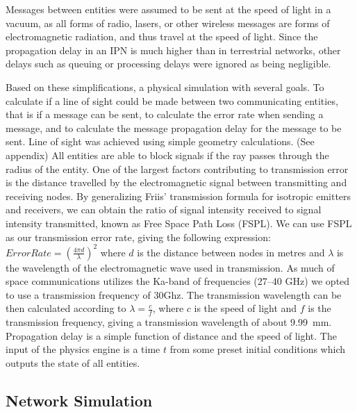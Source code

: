 \documentclass[a4paper,12pt]{article}
\begin{document}
Messages between entities were assumed to be sent at the speed of light in a
vacuum, as all forms of radio, lasers, or other wireless messages are forms of
electromagnetic radiation, and thus travel at the speed of light. Since the
propagation delay in an IPN is much higher than in terrestrial networks, other
delays such as queuing or processing delays were ignored as being negligible.

Based on these simplifications, a physical simulation with several goals. To
calculate if a line of sight could be made between two communicating entities,
that is if a message can be sent, to calculate the error rate when sending a
message, and to calculate the message propagation delay for the message to be
sent. Line of sight was achieved using simple geometry calculations. (See
appendix) All entities are able to block signals if the ray passes through the
radius of the entity. One of the largest factors contributing to transmission
error is the distance travelled by the electromagnetic signal between
transmitting and receiving nodes. By generalizing Friis' transmission
formula\cite{Friis} for isotropic emitters and receivers, we can obtain the
ratio of signal intensity received to signal intensity transmitted, known as
Free Space Path Loss (FSPL). We can use FSPL as our transmission error rate,
giving the following expression: $Error Rate = {(\frac{4 \pi d}{\lambda})}^2$
where $d$ is the distance between nodes in metres and $\lambda$ is the
wavelength of the electromagnetic wave used in transmission. As much of space
communications utilizes the Ka-band of frequencies (27--40
GHz)\cite{Morabito_Hastrup} we opted to use a transmission frequency of 30Ghz.
The transmission wavelength can be then calculated according to
$\lambda = \frac{c}{f}$, where $c$ is the speed of light and $f$ is the
transmission frequency, giving a transmission wavelength of about 9.99~mm.
Propagation delay is a simple function of distance and the speed of light. The
input of the physics engine is a time $t$ from some preset initial conditions
which outputs the state of all entities.

\subsection{Network Simulation}
\end{document}
